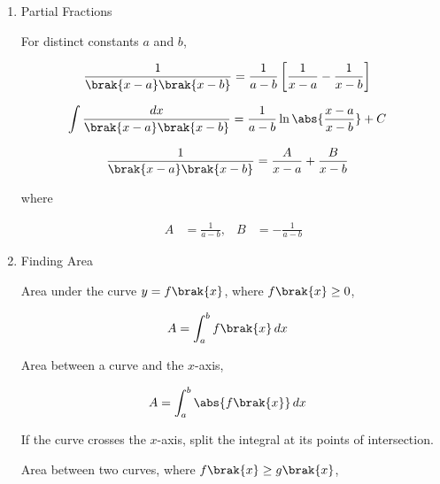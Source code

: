 \begin{enumerate}[label=\thesubsection.\arabic*, ref=\thesubsection.\theenumi]
For definite integrals,

\begin{align}
\int_a^b f\brak{g\brak{x}}g'\brak{x}\,dx
&= \int_{g\brak{a}}^{g\brak{b}} f\brak{u}\,du
\label{eq:EE26BTECH11211-Prob_4.2}
\end{align}

\begin{align}
\int \frac{f'\brak{x}}{f\brak{x}}\,dx
&= \ln\abs{f\brak{x}}+C
\label{eq:EE26BTECH11211-Prob_4.3}
\end{align}

\item 
Partial Fractions

For distinct constants $a$ and $b$,

\begin{align}
\frac{1}{\brak{x-a}\brak{x-b}}
&= \frac{1}{a-b}
\left[
\frac{1}{x-a}-\frac{1}{x-b}
\right]
\end{align}

\begin{align}
\int\frac{dx}{\brak{x-a}\brak{x-b}}
&= \frac{1}{a-b}
\ln\abs{\frac{x-a}{x-b}}+C
\end{align}

\begin{align}
\frac{1}{\brak{x-a}\brak{x-b}}
&= \frac{A}{x-a}+\frac{B}{x-b}
\label{eq:EE26BTECH11211-Prob_5.1}
\end{align}

where

\begin{align}
A &= \frac{1}{a-b},
& B &= -\frac{1}{a-b}
\end{align}

\item
Finding Area

Area under the curve $y=f\brak{x}$, where $f\brak{x}\geq 0$,

\begin{align}
A &= \int_a^b f\brak{x}\,dx\label{eq:EE26BTECH11211-Prob_6.1}
\end{align}

Area between a curve and the $x$-axis,

\begin{align}
A &= \int_a^b \abs{f\brak{x}}\,dx
\end{align}

If the curve crosses the $x$-axis, split the integral at its points of intersection.

Area between two curves, where $f\brak{x}\geq g\brak{x}$,


\end{enumerate}
